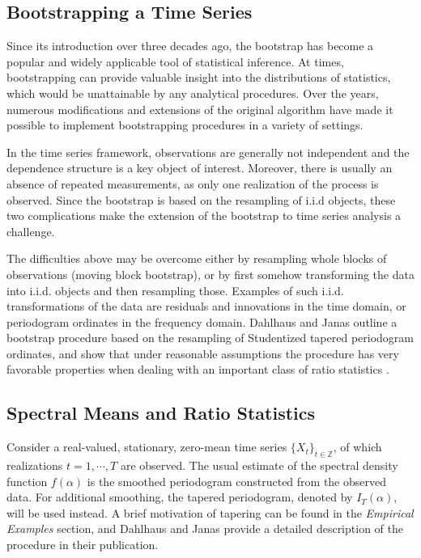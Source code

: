 
\subsection*{Bootstrapping a Time Series}
Since its introduction over three decades ago, the bootstrap has become a popular and widely applicable tool of statistical inference. At times, bootstrapping can provide valuable insight into the distributions of statistics, which would be unattainable by any analytical procedures. Over the years, numerous modifications and extensions of the original algorithm have made it possible to implement bootstrapping procedures in a variety of settings.

In the time series framework, observations are generally not independent and the dependence structure is a key object of interest. Moreover, there is usually an absence of repeated measurements, as only one realization of the process is observed. Since the bootstrap is based on the resampling of i.i.d objects, these two complications make the extension of the bootstrap to time series analysis a challenge.

The difficulties above may be overcome either by resampling whole blocks of observations (moving block bootstrap), or by first somehow transforming the data into i.i.d. objects and then resampling those. Examples of such i.i.d. transformations of the data are residuals and innovations in the time domain, or periodogram ordinates in the frequency domain. Dahlhaus and Janas outline a bootstrap procedure based on the resampling of Studentized tapered periodogram ordinates, and show that under reasonable assumptions the procedure has very favorable properties when dealing with an important class of ratio statistics \cite{bootstrap}.

\subsection*{Spectral Means and Ratio Statistics}

Consider a real-valued, stationary, zero-mean time series $\{X_t \}_{t\in\mathbb{Z}}$, of which realizations $t=1,\cdots,T$ are observed. The usual estimate of the spectral density function $f(\alpha)$ is the smoothed periodogram constructed from the observed data. For additional smoothing, the tapered periodogram, denoted by $I_T(\alpha)$, will be used instead. A brief motivation of tapering can be found in the \textit{Empirical Examples} section, and Dahlhaus and Janas provide a detailed description of the procedure in their publication.

